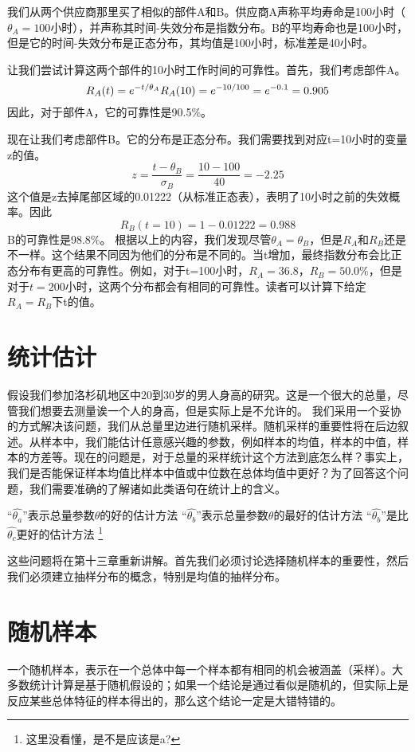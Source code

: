 \documentclass[cn,11pt,chinese]{elegantbook}
\begin{document}
{我们从两个供应商那里买了相似的部件A和B。供应商A声称平均寿命是100小时（$\theta_A=100$小时），并声称其时间-失效分布是指数分布。B的平均寿命也是100小时，但是它的时间-失效分布是正态分布，其均值是100小时，标准差是40小时。

让我们尝试计算这两个部件的10小时工作时间的可靠性。首先，我们考虑部件A。
$$R_A(t)=e^{-t/\theta_A}    \\
R_A(10)=e^{-10/100}=e^{-0.1}=0.905$$
因此，对于部件A，它的可靠性是90.5\%。

现在让我们考虑部件B。它的分布是正态分布。我们需要找到对应t=10小时的变量z的值。
$$z=\frac{t-\theta_B}{\sigma_B}=\frac{10-100}{40}=-2.25$$
这个值是z去掉尾部区域的0.01222（从标准正态表），表明了10小时之前的失效概率。因此
$$R_B(t=10)=1-0.01222=0.988$$
B的可靠性是98.8\%。
根据以上的内容，我们发现尽管$\theta_A=\theta_B$，但是$R_A$和$R_B$还是不一样。这个结果不同因为他们的分布是不同的。当t增加，最终指数分布会比正态分布有更高的可靠性。例如，对于t=100小时，$R_A=36.8$，$R_B=50.0\%$，但是对于$t=200$小时，这两个分布都会有相同的可靠性。读者可以计算下给定$R_A=R_B$下t的值。

\section{统计估计}

假设我们参加洛杉矶地区中20到30岁的男人身高的研究。这是一个很大的总量，尽管我们想要去测量诶一个人的身高，但是实际上是不允许的。
我们采用一个妥协的方式解决该问题，我们从总量里边进行随机采样。随机采样的重要性将在后边叙述。从样本中，我们能估计任意感兴趣的参数，例如样本的均值，样本的中值，样本的方差等。现在的问题是，对于总量的采样统计这个方法到底怎么样？事实上，我们是否能保证样本均值比样本中值或中位数在总体均值中更好？为了回答这个问题，我们需要准确的了解诸如此类语句在统计上的含义。

“$\hat{\theta_a}$”表示总量参数$\theta$的好的估计方法
“$\hat{\theta_b}$”表示总量参数$\theta$的最好的估计方法
“$\hat{\theta_b}$”是比$\hat{\theta_c}$更好的估计方法 \footnote{这里没看懂，是不是应该是a?}

这些问题将在第十三章重新讲解。首先我们必须讨论选择随机样本的重要性，然后我们必须建立抽样分布的概念，特别是均值的抽样分布。

\section{随机样本}

一个随机样本，表示在一个总体中每一个样本都有相同的机会被涵盖（采样）。大多数统计计算是基于随机假设的；如果一个结论是通过看似是随机的，但实际上是反应某些总体特征的样本得出的，那么这个结论一定是大错特错的。

}
\end{document}
